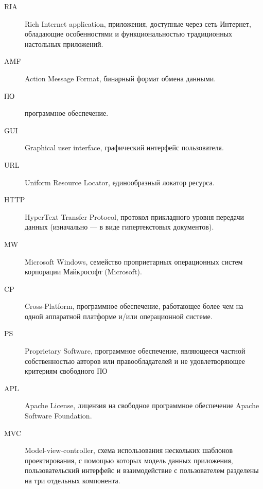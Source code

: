 \Abbreviations %
\begin{description}
\item[RIA] Rich Internet application, приложения, доступные через сеть Интернет, обладающие особенностями и
функциональностью традиционных настольных приложений.
\item[AMF] Action Message Format, бинарный формат обмена данными.
\item[ПО] программное обеспечение.
\item[GUI] Graphical user interface, графический интерфейс пользователя.
\item[URL] Uniform Resource Locator, единообразный локатор ресурса.
\item[HTTP] HyperText Transfer Protocol,  протокол прикладного уровня передачи данных (изначально — в виде
гипертекстовых документов).
\item[MW] Microsoft Windows, семейство проприетарных операционных систем корпорации Майкрософт (Microsoft).
\item[CP] Cross-Platform, программное обеспечение, работающее более чем на одной аппаратной платформе и/или
операционной системе.
\item[PS] Proprietary Software,  программное обеспечение, являющееся частной собственностью авторов или правообладателей
 и не удовлетворяющее критериям свободного ПО
\item[APL] Apache License,  лицензия на свободное программное обеспечение Apache Software Foundation.
\item[MVC] Model-view-controller, схема использования нескольких шаблонов проектирования, с помощью которых модель
данных приложения, пользовательский интерфейс и взаимодействие с пользователем разделены на три отдельных компонента.
\end{description}
